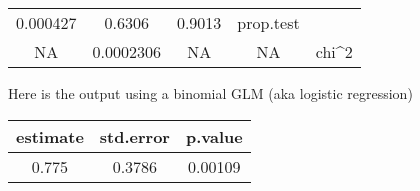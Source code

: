 \documentclass[]{book}
\theoremstyle{definition}
\theoremstyle{definition}
\theoremstyle{definition}
\theoremstyle{remark}
\begin{document}
\begin{longtable}[]{@{}ccccc@{}}
\begin{minipage}[t]{0.14\columnwidth}
0.000427\strut
\end{minipage} & \begin{minipage}[t]{0.13\columnwidth}\centering\strut
0.6306\strut
\end{minipage} & \begin{minipage}[t]{0.14\columnwidth}\centering\strut
0.9013\strut
\end{minipage} & \begin{minipage}[t]{0.14\columnwidth}\centering\strut
prop.test\strut
\end{minipage}\tabularnewline
\begin{minipage}[t]{0.13\columnwidth}\centering\strut
NA\strut
\end{minipage} & \begin{minipage}[t]{0.14\columnwidth}\centering\strut
0.0002306\strut
\end{minipage} & \begin{minipage}[t]{0.13\columnwidth}\centering\strut
NA\strut
\end{minipage} & \begin{minipage}[t]{0.14\columnwidth}\centering\strut
NA\strut
\end{minipage} & \begin{minipage}[t]{0.14\columnwidth}\centering\strut
chi\^{}2\strut
\end{minipage}\tabularnewline
\bottomrule
\end{longtable}

Here is the output using a binomial GLM (aka logistic regression)

\begin{longtable}[]{@{}ccc@{}}
\toprule
\begin{minipage}[b]{0.14\columnwidth}\centering\strut
estimate\strut
\end{minipage} & \begin{minipage}[b]{0.15\columnwidth}\centering\strut
std.error\strut
\end{minipage} & \begin{minipage}[b]{0.11\columnwidth}\centering\strut
p.value\strut
\end{minipage}\tabularnewline
\midrule
\endhead
\begin{minipage}[t]{0.14\columnwidth}\centering\strut
0.775\strut
\end{minipage} & \begin{minipage}[t]{0.15\columnwidth}\centering\strut
0.3786\strut
\end{minipage} & \begin{minipage}[t]{0.11\columnwidth}\centering\strut
0.00109\strut
\end{minipage}\tabularnewline
\bottomrule
\end{longtable}
\end{document}
